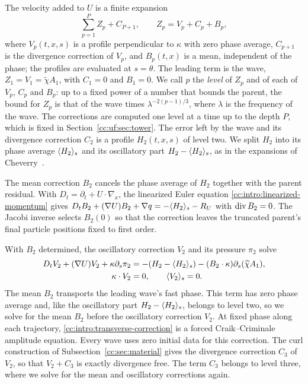 The velocity added to $U$ is a finite expansion
\[
 \sum_{p=1}^PZ_p+C_{P+1},\qquad Z_p=V_p+C_p+B_p,
\]
where $V_p(t,x,s)$ is a profile perpendicular to $\kappa$ with zero
phase average, $C_{p+1}$ is the divergence correction of $V_p$, and
$B_p(t,x)$ is a mean, independent of the phase; the profiles are
evaluated at $s=\theta$. The leading term is the wave,
$Z_1=V_1=\widetilde\chi A_1$, with $C_1=0$ and $B_1=0$. We call $p$ the
\emph{level} of $Z_p$ and of each of $V_p$, $C_p$ and $B_p$: up to a
fixed power of a number that bounds the parent, the bound for $Z_p$ is
that of the wave times $\lambda^{-2(p-1)/3}$, where $\lambda$ is the
frequency of the wave. The corrections are computed one level at a
time up to the depth $P$, which is fixed in
Section~\ref{cc:uf:sec:tower}.
The error left by the wave and its divergence correction $C_2$ is a
profile $H_2(t,x,s)$ of level two.
We split $H_2$ into its phase average $\langle H_2\rangle_s$ and its
oscillatory part $H_2-\langle H_2\rangle_s$, as in the expansions of
Cheverry~\cite[Section~4.1]{Cheverry2006}.

The mean correction $B_2$ cancels the phase average of $H_2$ together
with the parent residual. With $D_t=\partial_t+U\cdot\nabla_x$, the
linearized Euler equation \eqref{cc:intro:linearized-momentum} gives
$D_t B_2+(\nabla U)B_2+\nabla q=-\langle H_2\rangle_s-R_U$ with
$\operatorname{div} B_2=0$. The Jacobi inverse selects $B_2(0)$ so that the
correction leaves the truncated parent's final particle positions fixed
to first order.

With $B_2$ determined, the oscillatory correction $V_2$ and its pressure
$\pi_2$ solve
\begin{equation}\label{cc:intro:transverse-correction}
 \begin{split}
 D_tV_2+(\nabla U)V_2+\kappa\partial_s\pi_2
   &=-(H_2-\langle H_2\rangle_s)-(B_2\cdot\kappa)\partial_s(\widetilde\chi A_1),\\
 \kappa\cdot V_2&=0,\qquad \langle V_2\rangle_s=0.
 \end{split}
\end{equation}
The mean $B_2$ transports the leading wave's fast phase. This term has
zero phase average and, like the oscillatory part $H_2-\langle H_2\rangle_s$,
belongs to level two, so we solve for the mean $B_2$ before the
oscillatory correction $V_2$. At fixed phase along each trajectory,
\eqref{cc:intro:transverse-correction} is a forced Craik--Criminale
amplitude equation. Every wave uses
zero initial data for this correction. The curl construction of
Subsection~\ref{cc:sec:material} gives the divergence correction $C_3$
of $V_2$, so that $V_2+C_3$ is exactly divergence free. The term $C_3$
belongs to level three, where we solve for the mean and oscillatory
corrections again.

